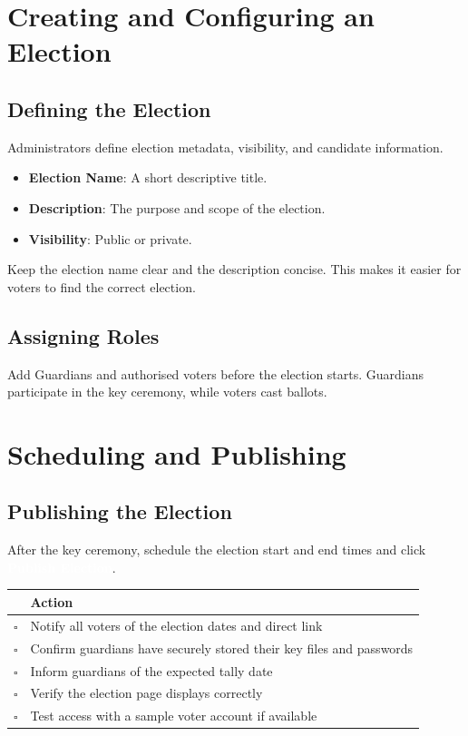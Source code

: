 \documentclass[12pt,a4paper]{book}
\newcommand{\uibutton}[1]{\colorbox{adminred}{\textcolor{white}{\small\textbf{#1}}}}
\begin{document}
\chapter{Creating and Configuring an Election}

\section{Defining the Election}

Administrators define election metadata, visibility, and candidate information.

\begin{itemize}
  \item \textbf{Election Name}: A short descriptive title.
  \item \textbf{Description}: The purpose and scope of the election.
  \item \textbf{Visibility}: Public or private.
\end{itemize}

\begin{tcolorbox}[tipbox]
Keep the election name clear and the description concise. This makes it easier for voters to find the correct election.
\end{tcolorbox}

\section{Assigning Roles}

Add Guardians and authorised voters before the election starts. Guardians participate in the key ceremony, while voters cast ballots.

\chapter{Scheduling and Publishing}

\section{Publishing the Election}

After the key ceremony, schedule the election start and end times and click \uibutton{Publish Election}.

\begin{center}
\begin{tabularx}{0.9\textwidth}{lX}
\toprule
\rowcolor{adminred}\color{white} & \color{white}Action \\
\midrule
\rowcolor{lightgray}$\square$ & Notify all voters of the election dates and direct link \\
$\square$ & Confirm guardians have securely stored their key files and passwords \\
\rowcolor{lightgray}$\square$ & Inform guardians of the expected tally date \\
$\square$ & Verify the election page displays correctly \\
\rowcolor{lightgray}$\square$ & Test access with a sample voter account if available \\
\bottomrule
\end{tabularx}
\end{center}
\end{document}
